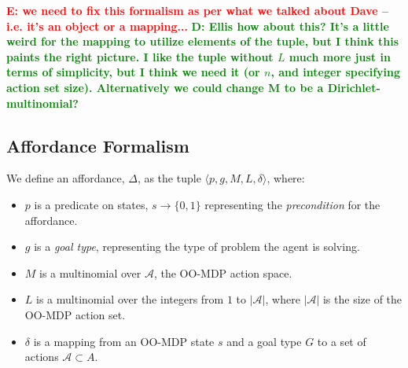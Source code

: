 \documentclass[conference]{IEEEtran}
\newcommand{\dnote}[1]{\textcolor{Green}{\textbf{D: #1}}}
\newcommand{\enote}[1]{\textcolor{Red}{\textbf{E: #1}}}
\begin{document}



\enote{we need to fix this formalism as per what we talked about Dave -- i.e. it's an object or a mapping...}
\dnote{Ellis how about this? It's a little weird for the mapping to utilize elements of the tuple, but I think this
paints the right picture. I like the tuple without $L$ much more just in terms of simplicity, but I think we need it (or $n$, and integer specifying action set size). Alternatively we could change M to be a Dirichlet-multinomial?}
\subsection{Affordance Formalism}
 We define an affordance, $\Delta$, as the tuple $\langle p, g, M, L, \delta\rangle$,
where:
\begin{itemize}
\item $p$ is a predicate on states, $s \longrightarrow \{$0$, 1\}$ representing the {\em precondition} for the affordance. 
\item $g$ is a {\it goal type}, representing the type of problem the agent is solving.
\item $M$ is a multinomial over $\mathcal{A}$, the OO-MDP action space.
\item $L$ is a multinomial over the integers from $1$ to $|\mathcal{A}|$, where $|\mathcal{A}|$ is the size of the OO-MDP action set.
\item $\delta$ is a mapping from an OO-MDP state $s$ and a goal type $G$ to a set of actions $\mathcal{A} \subset A$.
\end{itemize}
\end{document}
